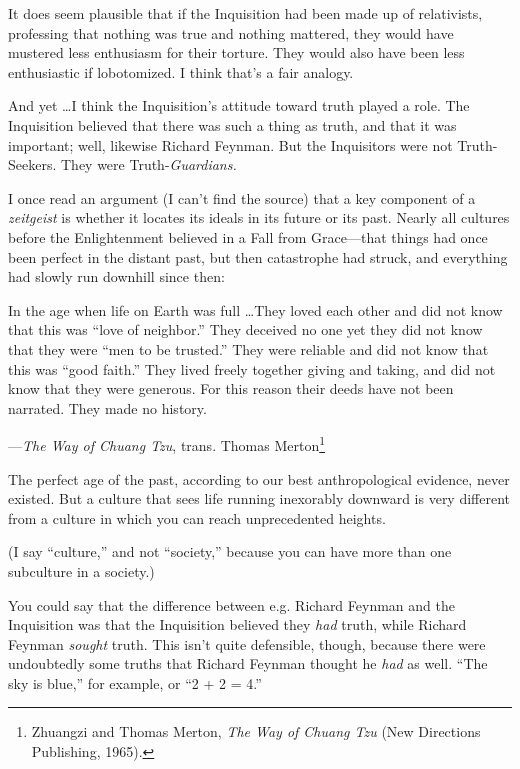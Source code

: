 {
 It does seem plausible that if the Inquisition had been made up of
relativists, professing that nothing was true and nothing mattered,
they would have mustered less enthusiasm for their torture. They would
also have been less enthusiastic if lobotomized. I think
that's a fair analogy.}

{
 And yet \ldots I think the Inquisition's attitude
toward truth played a role. The Inquisition believed that there was
such a thing as truth, and that it was important; well, likewise
Richard Feynman. But the Inquisitors were not Truth-Seekers. They were
Truth-\textit{Guardians.}}

{
 I once read an argument (I can't find the source)
that a key component of a \textit{zeitgeist} is whether it locates its
ideals in its future or its past. Nearly all cultures before the
Enlightenment believed in a Fall from Grace---that things had once been
perfect in the distant past, but then catastrophe had struck, and
everything had slowly run downhill since then:}

{
 In the age when life on Earth was full \ldots They loved each other
and did not know that this was ``love of
neighbor.'' They deceived no one yet they did not
know that they were ``men to be
trusted.'' They were reliable and did not know that
this was ``good faith.'' They lived
freely together giving and taking, and did not know that they were
generous. For this reason their deeds have not been narrated. They made
no history.}

{\raggedleft
 {}---\textit{The Way of Chuang Tzu}, trans. Thomas
Merton\footnote{Zhuangzi and Thomas Merton, \textit{The Way of Chuang Tzu} (New
Directions Publishing, 1965).}
\par}


\bigskip

{
 The perfect age of the past, according to our best anthropological
evidence, never existed. But a culture that sees life running
inexorably downward is very different from a culture in which you can
reach unprecedented heights.}

{
 (I say ``culture,'' and not
``society,'' because you can have
more than one subculture in a society.)}

{
 You could say that the difference between e.g. Richard Feynman and
the Inquisition was that the Inquisition believed they \textit{had}
truth, while Richard Feynman \textit{sought} truth. This
isn't quite defensible, though, because there were
undoubtedly some truths that Richard Feynman thought he \textit{had} as
well. ``The sky is blue,'' for
example, or ``2 + 2 = 4.''}

